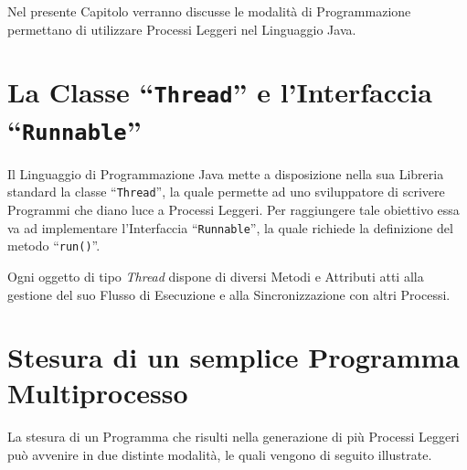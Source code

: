 Nel presente Capitolo verranno discusse le modalità di Programmazione permettano di utilizzare Processi Leggeri nel Linguaggio Java.

\section{La Classe ``\texttt{Thread}'' e l'Interfaccia ``\texttt{Runnable}''}
Il Linguaggio di Programmazione Java mette a disposizione nella sua Libreria standard la classe ``\texttt{Thread}''\cite{Thread_JavaDocs}, la quale permette ad uno sviluppatore di scrivere Programmi che diano luce a Processi Leggeri. Per raggiungere tale obiettivo essa va ad implementare l'Interfaccia ``\texttt{Runnable}''\cite{Runnable_JavaDocs}, la quale richiede la definizione del metodo ``\texttt{run()}''. \par

Ogni oggetto di tipo \textit{Thread} dispone di diversi Metodi e Attributi atti alla gestione del suo Flusso di Esecuzione e alla Sincronizzazione con altri Processi.

\section{Stesura di un semplice Programma Multiprocesso}
La stesura di un Programma che risulti nella generazione di più Processi Leggeri può avvenire in due distinte modalità, le quali vengono di seguito illustrate.

